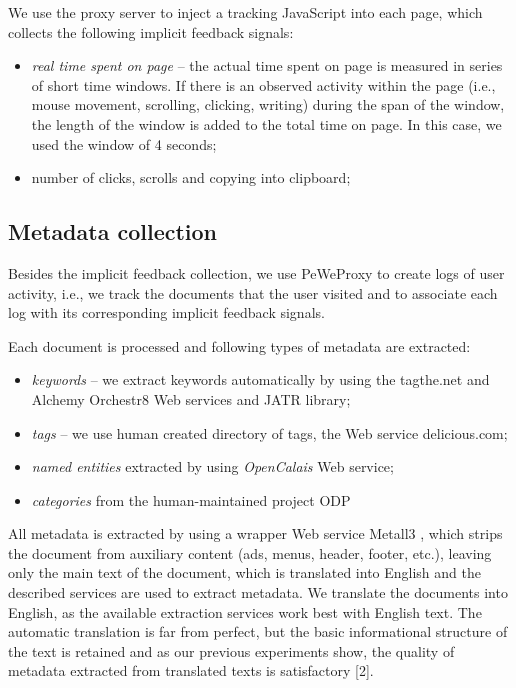 \documentclass{acm_proc_article-sp} %
\begin{document}
We use the proxy server to inject a tracking JavaScript into
each page, which collects the following implicit feedback signals:

\begin{itemize} 
	\item \textit{real time spent on page} – the actual time spent on page
	is measured in series of short time windows. If there
	is an observed activity within the page (i.e., mouse
	movement, scrolling, clicking, writing) during the span
	of the window, the length of the window is added to the
	total time on page. In this case, we used the window
	of 4 seconds;
	\item number of clicks, scrolls and copying into clipboard;
\end{itemize}

\subsection{Metadata collection}

Besides the implicit feedback collection, we use PeWeProxy
to create logs of user activity, i.e., we track the documents
that the user visited and to associate each log with its corresponding
implicit feedback signals.

Each document is processed and following types of metadata
are extracted:

\begin{itemize} 
	\item \textit{keywords} – we extract keywords automatically by using
	the tagthe.net and Alchemy Orchestr8 Web services
	and JATR library;
	\item \textit{tags} – we use human created directory of tags, the Web
		service delicious.com;
	\item \textit{named entities} extracted by using \textit{OpenCalais} Web
		service;
	\item \textit{categories} from the human-maintained project ODP
\end{itemize}

All metadata is extracted by using a wrapper Web service
Metall3
, which strips the document from auxiliary content
(ads, menus, header, footer, etc.), leaving only the main text
of the document, which is translated into English and the
described services are used to extract metadata. We translate
the documents into English, as the available extraction
services work best with English text. The automatic translation
is far from perfect, but the basic informational structure
of the text is retained and as our previous experiments show,
the quality of metadata extracted from translated texts is
satisfactory [2].
\end{document}
